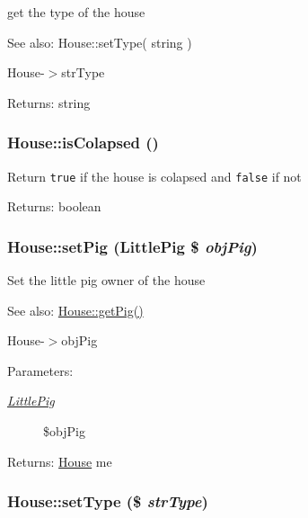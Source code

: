 get the type of the house

\begin{Desc}
\item[See also:]House::setType( string ) 

House-$>$strType \end{Desc}
\begin{Desc}
\item[Returns:]string \end{Desc}
\hypertarget{class_house_b1156bf34e22cdd3f365f2fa05b0cc2a}{
\subsubsection[{isColapsed}]{\setlength{\rightskip}{0pt plus 5cm}House::isColapsed ()}}
\label{class_house_b1156bf34e22cdd3f365f2fa05b0cc2a}


Return {\tt true} if the house is colapsed and {\tt false} if not

\begin{Desc}
\item[Returns:]boolean \end{Desc}
\hypertarget{class_house_4e3e7de303a5afc31c94c64ba2ca01ed}{
\subsubsection[{setPig}]{\setlength{\rightskip}{0pt plus 5cm}House::setPig ({\bf LittlePig} \$ {\em objPig})}}
\label{class_house_4e3e7de303a5afc31c94c64ba2ca01ed}


Set the little pig owner of the house

\begin{Desc}
\item[See also:]\hyperlink{class_house_a497d8ab1b49d9fa1839acd685060b7f}{House::getPig()} 

House-$>$objPig \end{Desc}
\begin{Desc}
\item[Parameters:]
\begin{description}
\item[{\em \hyperlink{class_little_pig}{LittlePig}}]\$objPig \end{description}
\end{Desc}
\begin{Desc}
\item[Returns:]\hyperlink{class_house}{House} me \end{Desc}
\hypertarget{class_house_f04781e06715dc18b8508aa711464239}{
\subsubsection[{setType}]{\setlength{\rightskip}{0pt plus 5cm}House::setType (\$ {\em strType})}}
\label{class_house_f04781e06715dc18b8508aa711464239}


